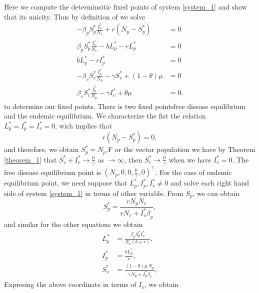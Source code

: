 Here we compute the determinsitic fixed points of system 
\eqref{system_1} and show that its unicity. Thus by definition of we solve 
%
\begin{equation}
	\begin{aligned}
		-\beta_p S_p^* \frac{I_v^*}{N_v} + r(N_p-S_p^*) &= 0\\
		\beta_p S_p^* \frac{I_v^*}{N_v} - b L_p^* - r L_p^* &= 0\\
		b L_p^* - r I_p^* &= 0\\
		-\beta_v S_v^* \frac{I_p^*}{N_p} -\gamma S_v^* +(1-\theta) \mu &= 0\\
		\beta_v S_v^* \frac{I_p^*}{N_p} -\gamma I_v^* + \theta \mu &= 0.
	\end{aligned}
\end{equation}
to determine our fixed points.
%
There is two fixed points\textemdash free disease equilibrium and the 
endemic equilibrium. We characterize the fist the relation
$ L^*_p=I_p^*=I_v^*=0$, wich implies that
%
\begin{equation*}
	r(N_p-S^*_p) = 0,
\end{equation*}
%
and therefore, we obtain $S_p^*=N_p$.F or the vector population we have by 
Theorem \eqref{theorem_1} that $S_v^*+I_v^* \rightarrow \frac{\mu}{\gamma}$ as 
$\rightarrow \infty$, then $S_v^* \rightarrow \frac{\mu}{\gamma}$ when we have 
$I^*_v=0$.
%
The free disease equilibrium point is $(N_p,0,0,\frac{\mu}{\gamma},0)^{\top}$. 
For the case of endemic equilibrium point, we need suppose that $L_p^*,I_p^*,I_
v^*\neq0$ and solve each right hand side of system \eqref{system_1} in terms 
of other variable.
%
From $\dot{S_p}$, we can obtain
%
\begin{equation*}
	S^*_p= \frac{rN_{{p}}N_{{v}}}{rN_{{v}}+I^*_v\beta_{{p}}},
\end{equation*}
%
 and similar for the other equations we obtain
\begin{equation*}
	\begin{aligned}
		L^*_p &= \frac{\beta_{{p}}S_p^* I_v^*}{N_{{v}} \left( b+r \right)},
		\\
		I^*_p &=\frac{b L^*_p}{r},
		\\
		S^*_v &=
			\frac{
				\left( 
					1-\theta 
				\right) 
				\mu\, N_{p}
			}{
				\gamma\, N_{p} + I ^ * _ p
				\beta_{v}
			},
	\end{aligned}
\end{equation*}
%
Expresing the above coordinate in terms of $I_v$, we obtain
